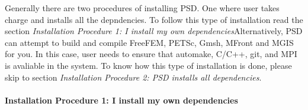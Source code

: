 Generally there are two procedures of installing PSD. One where user
takes charge and installs all the depndencies. To follow this type of
installation read the section \emph{Installation Procedure 1: I install
my own dependencies}Alternatively, PSD can attempt to build and compile
FreeFEM, PETSc, Gmsh, MFront and MGIS for you. In this case, user needs
to ensure that automake, C/C++, git, and MPI is avaliable in the system.
To know how this type of installation is done, please skip to section
\emph{Installation Procedure 2: PSD installs all dependencies}.

\paragraph{Installation Procedure 1: I install my own dependencies}


